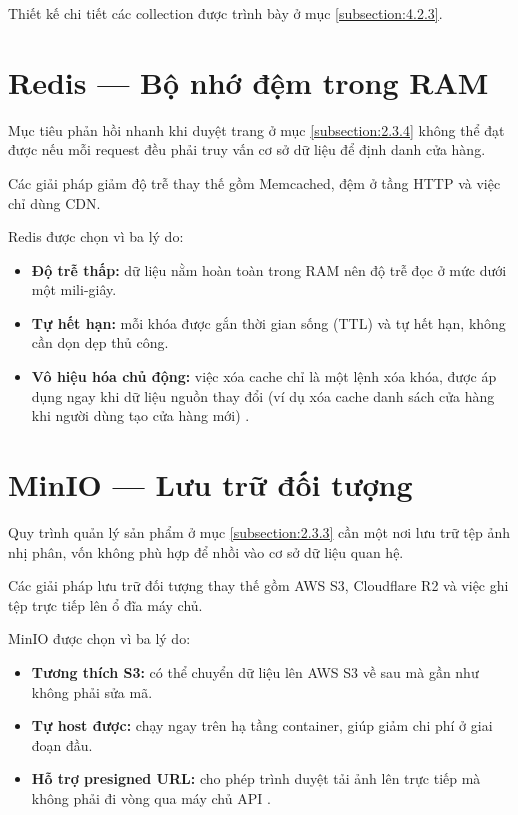 \documentclass[../main.tex]{subfiles}
\begin{document}
Thiết kế chi tiết các collection được trình bày ở mục \ref{subsection:4.2.3}.

\section{Redis --- Bộ nhớ đệm trong RAM}
\label{section:3.6}

Mục tiêu phản hồi nhanh khi duyệt trang ở mục \ref{subsection:2.3.4} không thể đạt được nếu mỗi request đều phải truy vấn cơ sở dữ liệu để định danh cửa hàng.

Các giải pháp giảm độ trễ thay thế gồm Memcached, đệm ở tầng HTTP và việc chỉ dùng CDN.

Redis được chọn vì ba lý do:

\begin{itemize}
    \item \textbf{Độ trễ thấp:} dữ liệu nằm hoàn toàn trong RAM nên độ trễ đọc ở mức dưới một mili-giây.
    \item \textbf{Tự hết hạn:} mỗi khóa được gắn thời gian sống (TTL) và tự hết hạn, không cần dọn dẹp thủ công.
    \item \textbf{Vô hiệu hóa chủ động:} việc xóa cache chỉ là một lệnh xóa khóa, được áp dụng ngay khi dữ liệu nguồn thay đổi (ví dụ xóa cache danh sách cửa hàng khi người dùng tạo cửa hàng mới) \cite{redis_docs}.
\end{itemize}

\section{MinIO --- Lưu trữ đối tượng}
\label{section:3.7}

Quy trình quản lý sản phẩm ở mục \ref{subsection:2.3.3} cần một nơi lưu trữ tệp ảnh nhị phân, vốn không phù hợp để nhồi vào cơ sở dữ liệu quan hệ.

Các giải pháp lưu trữ đối tượng thay thế gồm AWS S3, Cloudflare R2 và việc ghi tệp trực tiếp lên ổ đĩa máy chủ.

MinIO được chọn vì ba lý do:

\begin{itemize}
    \item \textbf{Tương thích S3:} có thể chuyển dữ liệu lên AWS S3 về sau mà gần như không phải sửa mã.
    \item \textbf{Tự host được:} chạy ngay trên hạ tầng container, giúp giảm chi phí ở giai đoạn đầu.
    \item \textbf{Hỗ trợ presigned URL:} cho phép trình duyệt tải ảnh lên trực tiếp mà không phải đi vòng qua máy chủ API \cite{minio_docs}.
\end{itemize}
\end{document}
